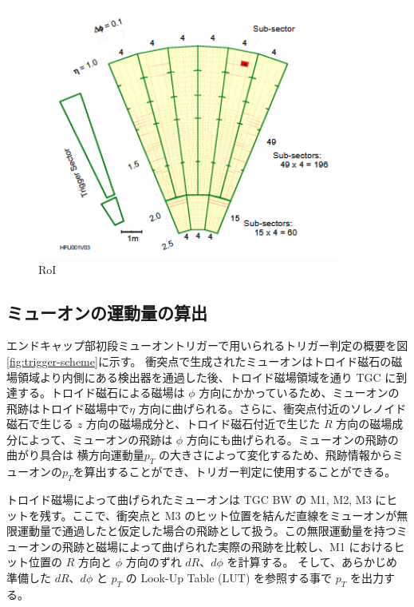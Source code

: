 \begin{figure}[tb]
  \centering
  \includegraphics[clip, width=10cm]{fig/3/RoI.png}
  \caption{RoI}
  \label{fig:RoI}
\end{figure}


\subsection{ミューオンの運動量の算出}\label{section:CW}
エンドキャップ部初段ミューオントリガーで用いられるトリガー判定の概要を図\ref{fig:trigger-scheme}に示す。
衝突点で生成されたミューオンはトロイド磁石の磁場領域より内側にある検出器を通過した後、トロイド磁場領域を通り TGC に到達する。トロイド磁石による磁場は $\phi$ 方向にかかっているため、ミューオンの飛跡はトロイド磁場中で$\eta$ 方向に曲げられる。さらに、衝突点付近のソレノイド磁石で生じる $z$ 方向の磁場成分と、トロイド磁石付近で生じた $R$ 方向の磁場成分によって、ミューオンの飛跡は $\phi$ 方向にも曲げられる。ミューオンの飛跡の曲がり具合は 横方向運動量$p_T$ の大きさによって変化するため、飛跡情報からミューオンの$p_T$を算出することができ、トリガー判定に使用することができる。

トロイド磁場によって曲げられたミューオンは TGC BW の M1, M2, M3 にヒットを残す。ここで、衝突点と M3 のヒット位置を結んだ直線をミューオンが無限運動量で通過したと仮定した場合の飛跡として扱う。この無限運動量を持つミューオンの飛跡と磁場によって曲げられた実際の飛跡を比較し、M1 におけるヒット位置の $R$ 方向と $\phi$ 方向のずれ $dR$、$d\phi$ を計算する。
そして、あらかじめ準備した $dR$、$d\phi$ と $p_T$ の Look-Up Table (LUT) を参照する事で $p_T$ を出力する。

